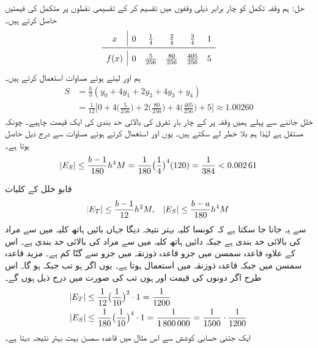 حل:\quad
ہم وقفہ تکمل کو چار برابر ذیلی وقفوں میں تقسیم کر کے تقسیمی نقطوں پر متکمل  کی قیمتیں حاصل کرتے ہیں۔
\begin{align*}
\renewcommand{\arraystretch}{1.5} 
\begin{array}{c|ccccc}
x&0&\frac{1}{4}&\frac{2}{4}&\frac{3}{4}&1\\
\midrule
f(x)&0&\frac{5}{256}&\frac{80}{256}&\frac{405}{256}&5
\end{array}
\end{align*}
ہم  اور  لیتے ہوئے مساوات  استعمال کرتے ہیں۔
\begin{align*}
S&=\frac{h}{3}(y_0+4y_1+2y_2+4y_3+y_4)\\
&=\frac{1}{12}\big[0+4\big(\frac{5}{256}\big)+2\big(\frac{80}{256}\big)+4\big(\frac{405}{256}\big)+5\big]\approx \num{1.00260}
\end{align*}
خلل جاننے سے پہلے ہمیں وقفہ  پر   کے چار بار تفرق  کی بالائی حد بندی کی ایک قیمت  چاہیے۔ چونکہ  مستقل ہے لہٰذا ہم بلا خطر  لے سکتے ہیں۔ یوں  اور  استعمال کرتے ہوئے مساوات  سے درج ذیل حاصل ہوتا ہے۔
\begin{align*}
\abs{E_S}\le\frac{b-1}{180}h^4M=\frac{1}{180}\big(\frac{1}{4}\big)^4(120)=\frac{1}{384}<\num{0.00261} 
\end{align*}

قابو خلل کے کلیات 
\begin{align*}
\abs{E_T}\le \frac{b-1}{12}h^2M,\quad \abs{E_S}\le \frac{b-a}{180}h^4M
\end{align*}
سے یہ جانا جا سکتا ہے کہ کونسا کلیہ بہتر نتیجہ دیگا جہاں بائیں ہاتھ کلیہ میں سے مراد  کی بالائی حد بندی ہے جبکہ دائیں ہاتھ کلیہ میں  سے مراد  کی بالائی حد بندی ہے۔ اس کے علاوہ قاعدہ سمسن میں جزو   قاعدہ ذوزنقہ میں جزو  سے  گنّا کم ہے۔ مزید قاعدہ سمسن میں  جبکہ قاعدہ ذوزنقہ میں  استعمال ہوتا ہے۔ یوں اگر  ہو تب  جبکہ  ہو گا۔ اس طرح اگر دونوں  کی قیمت  اور   ہوں تب  کی صورت میں  درج ذیل ہوں گے۔
\begin{align*}
\abs{E_T}&\le \frac{1}{12}\big(\frac{1}{10}\big)^2\cdot 1=\frac{1}{1200}\\
\abs{E_S}&\le \frac{1}{180}\big(\frac{1}{10}\big)^4\cdot 1=\frac{1}{\num{1800000}}=\frac{1}{1500}\cdot \frac{1}{1200}
\end{align*}
ایک جتنی حسابی کوشش سے اس مثال میں  قاعدہ سمسن بہت بہتر نتیجہ دیتا ہے۔

